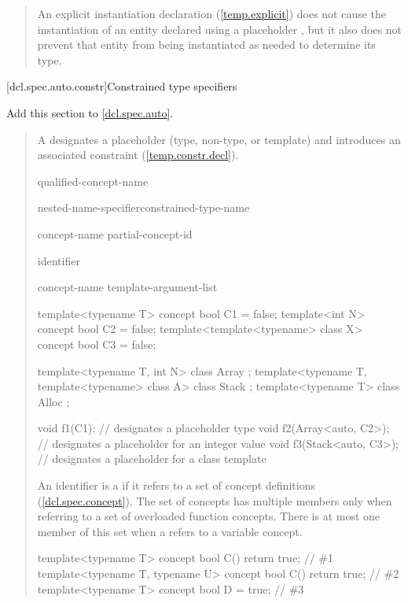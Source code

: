 \begin{quote}
\setcounter{Paras}{7}
\pnum
An explicit instantiation declaration (\ref{temp.explicit}) does not cause the 
instantiation of an entity declared using a placeholder , but it 
also does not prevent that entity from being instantiated as needed to 
determine its type. 
\end{quote}

[dcl.spec.auto.constr]{Constrained type specifiers}

Add this section to \ref{dcl.spec.auto}.

\begin{quote}
\pnum
A  designates a placeholder
(type, non-type, or template) and introduces an associated constraint
(\ref{temp.constr.decl}).

\begin{bnf}
\br
	qualified-concept-name

\br
	nested-name-specifier\opt constrained-type-name

\br
  concept-name\br
  partial-concept-id

\br
  identifier

\br
		concept-name \terminal{<} template-argument-list\opt \terminal{>}
\end{bnf}

\enterexample
\begin{codeblock}
template<typename T> concept bool C1 = false;
template<int N> concept bool C2 = false;
template<template<typename> class X> concept bool C3 = false;

template<typename T, int N> class Array { };
template<typename T, template<typename> class A> class Stack { };
template<typename T> class Alloc { };

void f1(C1);              //  designates a placeholder type
void f2(Array<auto, C2>); //  designates a placeholder for an integer value
void f3(Stack<auto, C3>); //  designates a placeholder for a class template
\end{codeblock}
\exitexample

\pnum
An identifier is a  if it refers to a set of 
concept definitions (\ref{dcl.spec.concept}).
%
\enternote
The set of concepts has multiple members only when referring to a set of 
overloaded function concepts. There is at most one member of this set when a
 refers to a variable concept.
\exitnote
%
\enterexample
\begin{codeblock}
template<typename T> concept bool C() { return true; }             // \#1
template<typename T, typename U> concept bool C() { return true; } // \#2
template<typename T> concept bool D = true;                        // \#3


\end{codeblock}
\end{quote}
